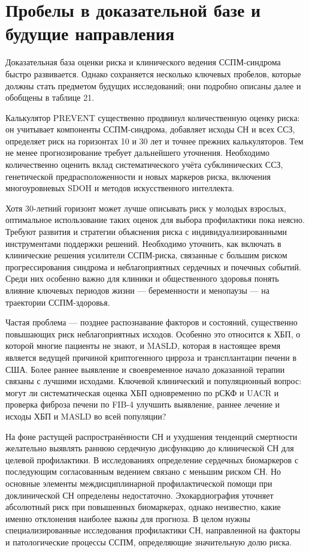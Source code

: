 \documentclass[11pt,a4paper]{article}
\begin{document}
\section{Пробелы в доказательной базе и будущие направления}
Доказательная база оценки риска и клинического ведения ССПМ-синдрома быстро развивается. Однако сохраняется несколько ключевых пробелов, которые должны стать предметом будущих исследований; они подробно описаны далее и обобщены в таблице 21.

Калькулятор PREVENT существенно продвинул количественную оценку риска: он учитывает компоненты ССПМ-синдрома, добавляет исходы СН и всех ССЗ, определяет риск на горизонтах 10 и 30 лет и точнее прежних калькуляторов. Тем не менее прогнозирование требует дальнейшего уточнения. Необходимо количественно оценить вклад систематического учёта субклинических ССЗ, генетической предрасположенности и новых маркеров риска, включения многоуровневых SDOH и методов искусственного интеллекта.

Хотя 30-летний горизонт может лучше описывать риск у молодых взрослых, оптимальное использование таких оценок для выбора профилактики пока неясно. Требуют развития и стратегии объяснения риска с индивидуализированными инструментами поддержки решений. Необходимо уточнить, как включать в клинические решения усилители ССПМ-риска, связанные с большим риском прогрессирования синдрома и неблагоприятных сердечных и почечных событий. Среди них особенно важно для клиники и общественного здоровья понять влияние ключевых периодов жизни --- беременности и менопаузы --- на траектории ССПМ-здоровья.

Частая проблема --- позднее распознавание факторов и состояний, существенно повышающих риск неблагоприятных исходов. Особенно это относится к ХБП, о которой многие пациенты не знают, и MASLD, которая в настоящее время является ведущей причиной криптогенного цирроза и трансплантации печени в США. Более раннее выявление и своевременное начало доказанной терапии связаны с лучшими исходами. Ключевой клинический и популяционный вопрос: могут ли систематическая оценка ХБП одновременно по рСКФ и UACR и проверка фиброза печени по FIB-4 улучшить выявление, раннее лечение и исходы ХБП и MASLD во всей популяции?

На фоне растущей распространённости СН и ухудшения тенденций смертности желательно выявлять раннюю сердечную дисфункцию до клинической СН для целевой профилактики. В исследованиях определение сердечных биомаркеров с последующим согласованным ведением связано с меньшим риском СН. Но основные элементы междисциплинарной профилактической помощи при доклинической СН определены недостаточно. Эхокардиография уточняет абсолютный риск при повышенных биомаркерах, однако неизвестно, какие именно отклонения наиболее важны для прогноза. В целом нужны специализированные исследования профилактики СН, направленной на факторы и патологические процессы ССПМ, определяющие значительную долю риска.
\end{document}
